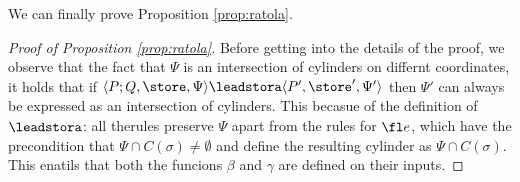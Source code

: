 We can finally prove Proposition \ref{prop:ratola}.

\begin{proof}[Proof of Proposition \ref{prop:ratola}]
  Before getting into the details of the proof, we observe that the fact that
  $\Psi$ is an intersection of cylinders on differnt coordinates, it holds that if
  $\langle P;Q, \store,\Psi\rangle \leadstora \langle P', \store',\Psi'\rangle$
  then $\Psi'$ can always be expressed as an intersection of cylinders.
  This becasue of the definition of $\leadstora$: all therules preserve $\Psi$
  apart from the rules for $\fl e$, which have the precondition that
  $\Psi\cap C(\sigma)\neq \emptyset$ and define the resulting cylinder as $\Psi\cap C(\sigma)$.
  This enatils
  that both the funcions $\beta$ and $\gamma$ are defined on their inputs.


\end{proof}
